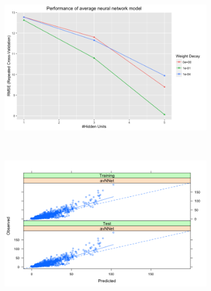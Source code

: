 \documentclass[letterpaper,12pt,titlepage,oneside,final]{report}
\begin{document}
                \begin{figure}[!ht]
                \begin{subfigure}[t]{0.5\textwidth}
                    \centering
                    \includegraphics[width=\textwidth]{avnnetresults}
                    \caption{}
                    \label{avnnetresults}
                \end{subfigure}%
                    ~ 
                \begin{subfigure}[t]{0.5\textwidth}
                    \centering
                    \includegraphics[width=\textwidth]{avnnet_pred_obs}
                    \caption{}
                    \label{avnnet_pred_obs}
                \end{subfigure}
                \end{figure}
                \clearpage
\end{document}
